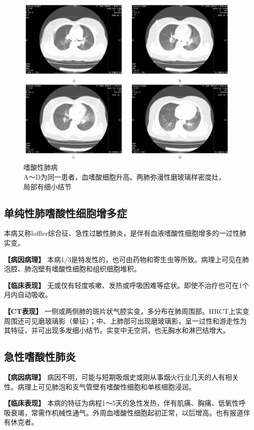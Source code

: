 \begin{figure}[!htbp]
 \centering
 \includegraphics[width=.7\textwidth,height=\textheight,keepaspectratio]{./images/Image00239.jpg}
 \captionsetup{justification=centering}
 \caption{嗜酸性肺病\\{\small A～D为同一患者，血嗜酸细胞升高。两肺弥漫性磨玻璃样密度灶，局部有细小结节}}
 \label{fig9-42}
  \end{figure} 

\subsection{单纯性肺嗜酸性细胞增多症}

本病又称loffler综合征、急性过敏性肺炎，是伴有血液嗜酸性细胞增多的一过性肺实变。

\textbf{【病因病理】}
本病1/3是特发性的，也可由药物和寄生虫等所致。病理上可见在肺泡腔、肺泡壁有嗜酸性细胞和组织细胞堆积。

\textbf{【临床表现】}
无或仅有轻度咳嗽、发热或呼吸困难等症状。即使不治疗也可在1个月内自动吸收。

\textbf{【CT表现】}
一侧或两侧肺的斑片状气腔实变，多分布在肺周围部。HRCT上实变周围还可见磨玻璃影（晕征）；中、上肺部可出现磨玻璃影，呈一过性和游走性为其特征，并可出现多发细小结节。实变中无空洞，也无胸水和淋巴结增大。

\subsection{急性嗜酸性肺炎}

\textbf{【病因病理】}
病因不明，可能与短期吸烟史或刚从事烟火行业几天的人有相关性。病理上可见肺泡和支气管壁有嗜酸性细胞和单核细胞浸润。

\textbf{【临床表现】}
本病的特征为病程1～5天的急性发热，伴有肌痛、胸痛、低氧性呼吸衰竭，常需作机械性通气。外周血嗜酸性细胞起初正常，以后增高。也有报道伴有休克者。

